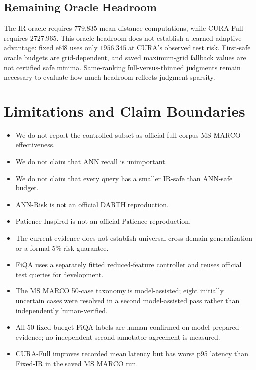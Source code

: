 \documentclass[10pt,twocolumn]{article}
\newcommand{\cura}{CURA}
\begin{document}
\subsection{Remaining Oracle Headroom}
The IR oracle requires $779.835$ mean distance computations, while \cura{}-Full requires $2727.965$. This oracle headroom does not establish a learned adaptive advantage: fixed ef48 uses only $1956.345$ at CURA's observed test risk. First-safe oracle budgets are grid-dependent, and saved maximum-grid fallback values are not certified safe minima. Same-ranking full-versus-thinned judgments remain necessary to evaluate how much headroom reflects judgment sparsity.

\section{Limitations and Claim Boundaries}
\label{sec:limitations}
\begin{tcolorbox}[colback=RiskLight,colframe=RiskRed,title=\textbf{Claims Not Made},fonttitle=\small,boxrule=0.8pt]
\small
\begin{itemize}
\item We do not report the controlled subset as official full-corpus MS MARCO effectiveness.
\item We do not claim that ANN recall is unimportant.
\item We do not claim that every query has a smaller IR-safe than ANN-safe budget.
\item ANN-Risk is not an official DARTH reproduction.
\item Patience-Inspired is not an official Patience reproduction.
\item The current evidence does not establish universal cross-domain generalization or a formal 5\% risk guarantee.
\item FiQA uses a separately fitted reduced-feature controller and reuses official test queries for development.
\item The MS MARCO 50-case taxonomy is model-assisted; eight initially uncertain cases were resolved in a second model-assisted pass rather than independently human-verified.
\item All 50 fixed-budget FiQA labels are human confirmed on model-prepared evidence; no independent second-annotator agreement is measured.
\item CURA-Full improves recorded mean latency but has worse p95 latency than Fixed-IR in the saved MS MARCO run.
\end{itemize}
\end{tcolorbox}
\end{document}
